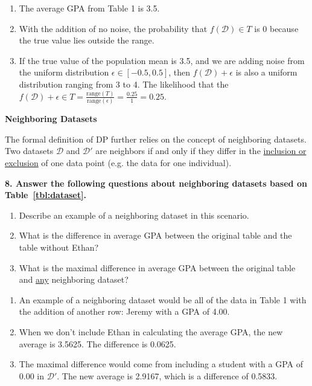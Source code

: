 \documentclass{article}
\begin{document}
\bigskip
\begin{mdframed}
\begin{enumerate}[label=\Alph*.]
\item The average GPA from Table 1 is 3.5.
\item With the addition of no noise, the probability that $f(\mathcal{D})\in T$ is 0 because the true value lies outside the range. 
\item If the true value of the population mean is 3.5, and we are adding noise from the uniform distribution $\epsilon \in [-0.5, 0.5]$, then $f(\mathcal{D}) +\epsilon$ is also a uniform distribution ranging from 3 to 4. The likelihood that the $f(\mathcal{D}) +\epsilon \in T = \frac{\text{range}{(T)}}{\text{range}(\epsilon)}= \frac{0.25}{1} = 0.25 $.
\end{enumerate}
\end{mdframed}
\bigskip

\textbf{Neighboring Datasets}

The formal definition of DP further relies on the concept of neighboring datasets. Two datasets $\mathcal{D}$ and $\mathcal{D}'$ are neighbors if and only if they differ in the \underline{inclusion or exclusion} of one data point (e.g. the data for one individual).

\textbf{8. Answer the following questions about neighboring datasets based on Table~\ref{tbl:dataset}.}
\begin{enumerate}[label=\Alph*.]
\item Describe an example of a neighboring dataset in this scenario.
\item What is the difference in average GPA between the original table and the table without Ethan?
\item What is the maximal difference in average GPA between the original table and \underline{any} neighboring dataset?
\end{enumerate}

\bigskip
\begin{mdframed}
\begin{enumerate}[label=\Alph*.]
\item An example of a neighboring dataset would be all of the data in Table 1 with the addition of another row: Jeremy with a GPA of 4.00.
\item When we don't include Ethan in calculating the average GPA, the new average is 3.5625. The difference is 0.0625.
\item The maximal difference would come from including a student with a GPA of 0.00 in $\mathcal{D}'$. The new average is 2.9167, which is a difference of 0.5833.
\end{enumerate}
\end{mdframed}
\bigskip
\end{document}
